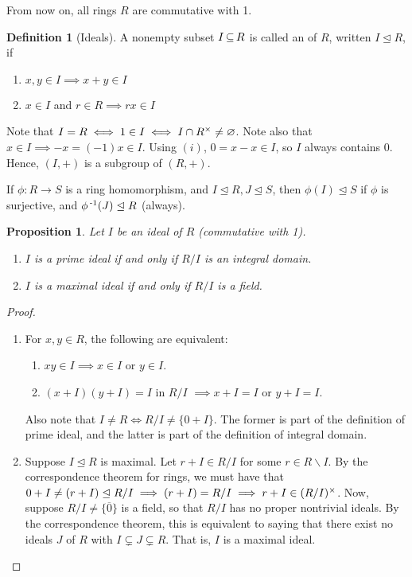 \documentclass[11pt]{book}
\newcounter{counter}
\newtheorem{proposition}[counter]{Proposition}   \newtheorem{problem}[counter]{Problem}   \newtheorem*{proposition*}{Proposition}   \newtheorem*{lemma*}{Lemma}
\theoremstyle{definition}   \newtheorem{defn}[counter]{Definition} %
\newtheorem*{defn*}{Definition}
\newcommand{\ov}{\overline}   \newcommand{\wt}{\widetilde}
\newcommand{\bs}{\backslash}   \newcommand{\A}{\mathcal{A}}   \newcommand{\sy}{\textnormal{Syl}}   \newcommand{\size}[1]{\left| #1 \right|}
\newcommand{\nsg}{\mathrel{\unlhd}}   \newcommand{\ind}{\parindent24pt}   \newcommand{\vn}{\varnothing}
\DeclareMathOperator{\ra}{\rightarrow}   \DeclareMathOperator{\Poly}{\mathbf{P}}   \DeclareMathOperator{\spn}{\textnormal{span}}   \DeclareMathOperator{\aut}{\textnormal{Aut}}
\newcommand{\vs}{\vspace{8pt}}
\numberwithin{counter}{chapter}
\begin{document}
\vs

From now on, all rings $R$ are commutative with 1.

\vs

\begin{defn*}[Ideals]
A nonempty subset $I \operatorname{\subseteq} R$ is called an  of $R$, written $I \nsg R$, if
\begin{enumerate}
\item[(i)] $x,y \in I \implies x+y \in I$
\item[(ii)] $x \in I$ and $r \in R \implies rx \in I$
\end{enumerate}
Note that $I = R \iff 1 \in I \iff I \cap R\x \ne \vn$. Note also that $x \in I \implies -x = (-1)x \in I$. Using $(i)$, $0 = x-x \in I$, so $I$ always contains $0$. Hence, $(I,+)$ is a subgroup of $(R,+)$.
\end{defn*}

\vs

\begin{remark}
If $\phi : R \ra S$ is a ring homomorphism, and $I \nsg R, J \nsg S$, then $\phi(I) \nsg S$ if $\phi$ is surjective, and $\phi\inv(J) \nsg R$ (always).
\end{remark}

\vs





\begin{proposition}
Let $I$ be an ideal of $R$ (commutative with 1).
\begin{enumerate}
\item[(a)] $I$ is a prime ideal if and only if $R/I$ is an integral domain.
\item[(b)] $I$ is a maximal ideal if and only if $R/I$ is a field.
\end{enumerate}
\end{proposition}

\begin{proof}\
\begin{enumerate}
\item[(a)] For $x,y \in R$, the following are equivalent:
	\begin{enumerate}
	\item[(i)] $xy \in I \implies x \in I$ or $y \in I$.
	\item[(ii)] $(x+I)(y+I) = I$ in $R/I$ $\implies x+I = I$ or $y+I = I$.
	\end{enumerate}
Also note that $I \ne R \iff R/I \ne \{0+I\}$. The former is part of the definition of prime ideal, and the latter is part of the definition of integral domain.

\item[(b)] Suppose $I \nsg R$ is maximal. Let $r + I \in R/I$ for some $r \in R\bs I$. By the correspondence theorem for rings, we must have that $0 + I \ne (r+I) \nsg R/I \implies (r+I) = R/I \implies r+I \in (R/I)\x$. Now, suppose $R/I \ne \{\ov{0}\}$ is a field, so that $R/I$ has no proper nontrivial ideals. By the correspondence theorem, this is equivalent to saying that there exist no ideals $J$ of $R$ with $I \subsetneq J \subsetneq R$. That is, $I$ is a maximal ideal.
\end{enumerate}
\end{proof}
\end{document}
